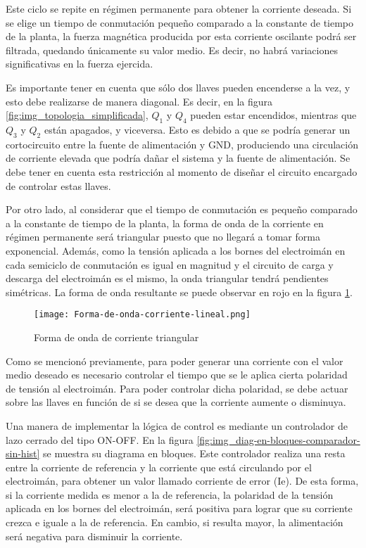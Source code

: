Este ciclo se repite en régimen permanente para obtener la corriente deseada. Si se elige un tiempo de conmutación pequeño comparado a la constante de tiempo de la planta, la fuerza magnética producida por esta corriente oscilante podrá ser filtrada, quedando únicamente su valor medio. Es decir, no habrá variaciones significativas en la fuerza ejercida.

Es importante tener en cuenta que sólo dos llaves pueden encenderse a la vez, y esto debe realizarse de manera diagonal. Es decir, en la figura \ref{fig:img_topologia_simplificada}, $Q_1$ y $Q_4$ pueden estar encendidos, mientras que $Q_3$ y $Q_2$ están apagados, y viceversa. Esto es debido a que se podría generar un cortocircuito entre la fuente de alimentación y GND, produciendo una circulación de corriente elevada que podría dañar el sistema y la fuente de alimentación. Se debe tener en cuenta esta restricción al momento de diseñar el circuito encargado de controlar estas llaves.

Por otro lado, al considerar que el tiempo de conmutación es pequeño comparado a la constante de tiempo de la planta, la forma de onda de la corriente en régimen permanente será triangular puesto que no llegará a tomar forma exponencial. Además, como la tensión aplicada a los bornes del electroimán en cada semiciclo de conmutación es igual en magnitud y el circuito de carga y descarga del electroimán es el mismo, la onda triangular tendrá pendientes simétricas. La forma de onda resultante se puede observar en rojo en la figura \ref{fig:img_corriente_triangular}.

\begin{figure}[H]
	\centering
	\texttt{[image: Forma-de-onda-corriente-lineal.png]}
	\caption{Forma de onda de corriente triangular}
	\label{fig:img_corriente_triangular}
\end{figure} 

Como se mencionó previamente, para poder generar una corriente con el valor medio deseado es necesario controlar el tiempo que se le aplica cierta polaridad de tensión al electroimán. Para poder controlar dicha polaridad, se debe actuar sobre las llaves en función de si se desea que la corriente aumente o disminuya.

Una manera de implementar la lógica de control es mediante un controlador de lazo cerrado del tipo ON-OFF. En la figura \ref{fig:img_diag-en-bloques-comparador-sin-hist} se muestra su diagrama en bloques. Este controlador realiza una resta entre la corriente de referencia y la corriente que está circulando por el electroimán, para obtener un valor llamado corriente de error (Ie). De esta forma, si la corriente medida es menor a la de referencia, la polaridad de la tensión aplicada en los bornes del electroimán, será positiva para lograr que su corriente crezca e iguale a la de referencia. En cambio, si resulta mayor, la alimentación será negativa para disminuir la corriente.


